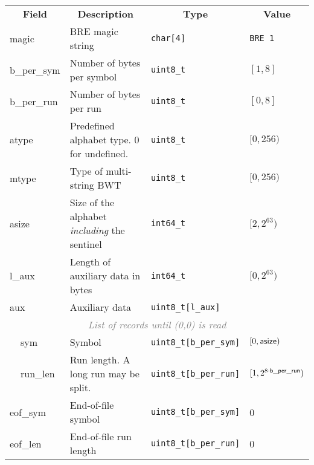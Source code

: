 \documentclass[10pt]{article}
\begin{document}
\begin{table}[ht]
\centering
{\small
\begin{tabular}{|l|l|p{6.7cm}|l|l|}
  \cline{1-5}
  \multicolumn{2}{|c|}{\bf Field} & \multicolumn{1}{c|}{\bf Description} & \multicolumn{1}{c|}{\bf Type} & \multicolumn{1}{c|}{\bf Value} \\\cline{1-5}
  \multicolumn{2}{|l|}{\sf magic} & BRE magic string & {\tt char[4]} & {\tt BRE\char92 1}\\\cline{1-5}
  \multicolumn{2}{|l|}{\sf b\_per\_sym} & Number of bytes per symbol & {\tt uint8\_t} & $[1,8]$ \\\cline{1-5}
  \multicolumn{2}{|l|}{\sf b\_per\_run} & Number of bytes per run & {\tt uint8\_t} & $[0,8]$ \\\cline{1-5}
  \multicolumn{2}{|l|}{\sf atype} & Predefined alphabet type. 0 for undefined. & {\tt uint8\_t} & $[0,256)$ \\\cline{1-5}
  \multicolumn{2}{|l|}{\sf mtype} & Type of multi-string BWT & {\tt uint8\_t} & $[0,256)$ \\\cline{1-5}
  \multicolumn{2}{|l|}{\sf asize} & Size of the alphabet \emph{including} the sentinel & {\tt int64\_t} & $[2,2^{63})$ \\\cline{1-5}
  \multicolumn{2}{|l|}{\sf l\_aux} & Length of auxiliary data in bytes & {\tt int64\_t} & $[0,2^{63})$ \\\cline{1-5}
  \multicolumn{2}{|l|}{\sf aux} & Auxiliary data & {\tt uint8\_t[l\_aux]} & \\\cline{1-5}
  \multicolumn{5}{|c|}{\textcolor{gray}{\it List of records until (0,0) is read}} \\\cline{2-5}
  & {\sf sym} & Symbol & {\tt uint8\_t[b\_per\_sym]} & $[0,{\sf asize})$ \\\cline{2-5}
  & {\sf run\_len} & Run length. A long run may be split. & {\tt uint8\_t[b\_per\_run]} & $[1,2^{8\cdot{\sf b\_per\_run}})$ \\\cline{1-5}
  \multicolumn{2}{|l|}{\sf eof\_sym} & End-of-file symbol & {\tt uint8\_t[b\_per\_sym]} & 0 \\\cline{1-5}
  \multicolumn{2}{|l|}{\sf eof\_len} & End-of-file run length & {\tt uint8\_t[b\_per\_run]} & 0 \\\cline{1-5}
\end{tabular}}
\end{table}
\end{document}
